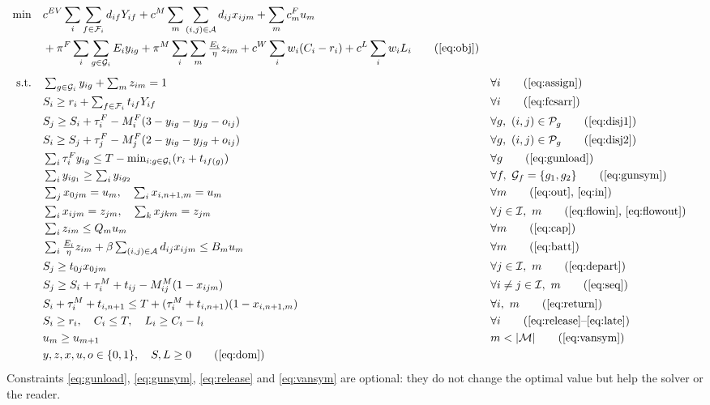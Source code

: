 \documentclass[11pt,a4paper]{article}
\newcommand{\I}{\mathcal{I}}
\newcommand{\F}{\mathcal{F}}
\newcommand{\G}{\mathcal{G}}
\newcommand{\M}{\mathcal{M}}
\newcommand{\A}{\mathcal{A}}
\begin{document}
{\small
\begin{align*}
\min\quad & c^{EV}\sum_{i}\sum_{f\in\F_i} d_{if}Y_{if}+c^{M}\sum_{m}\sum_{(i,j)\in\A} d_{ij}x_{ijm}+\sum_{m} c^{F}_mu_m \\
&+\pi^F\sum_{i}\sum_{g\in\G_i} E_iy_{ig}+\pi^M\sum_{i}\sum_{m}\tfrac{E_i}{\eta}z_{im}
+c^W\sum_{i} w_i(C_i - r_i)+c^L\sum_{i} w_iL_i \tag{\ref{eq:obj}}\\[4pt]
\text{s.t.}\quad
& \textstyle\sum_{g\in\G_i} y_{ig} + \sum_{m} z_{im} = 1 && \forall i \tag{\ref{eq:assign}}\\
& S_i \ge r_i + \textstyle\sum_{f\in\F_i} t_{if}Y_{if} && \forall i \tag{\ref{eq:fcsarr}}\\
& S_j \ge S_i + \tau^F_i - M^F_i(3 - y_{ig} - y_{jg} - o_{ij}) && \forall g,\ (i,j)\in\mathcal{P}_g \tag{\ref{eq:disj1}}\\
& S_i \ge S_j + \tau^F_j - M^F_j(2 - y_{ig} - y_{jg} + o_{ij}) && \forall g,\ (i,j)\in\mathcal{P}_g \tag{\ref{eq:disj2}}\\
& \textstyle\sum_{i}\tau^F_iy_{ig} \le T - \min_{i:g\in\G_i}(r_i+t_{if(g)}) && \forall g \tag{\ref{eq:gunload}}\\
& \textstyle\sum_{i} y_{ig_1} \ge \sum_{i} y_{ig_2} && \forall f,\ \G_f=\{g_1,g_2\} \tag{\ref{eq:gunsym}}\\
& \textstyle\sum_{j} x_{0jm} = u_m,\quad \sum_{i} x_{i,n+1,m} = u_m && \forall m \tag{\ref{eq:out}, \ref{eq:in}}\\
& \textstyle\sum_{i} x_{ijm} = z_{jm},\quad \sum_{k} x_{jkm} = z_{jm} && \forall j\in\I,\ m \tag{\ref{eq:flowin}, \ref{eq:flowout}}\\
& \textstyle\sum_{i} z_{im} \le Q_mu_m && \forall m \tag{\ref{eq:cap}}\\
& \textstyle\sum_{i}\frac{E_i}{\eta}z_{im} + \beta\sum_{(i,j)\in\A} d_{ij}x_{ijm} \le B_mu_m && \forall m \tag{\ref{eq:batt}}\\
& S_j \ge t_{0j}x_{0jm} && \forall j\in\I,\ m \tag{\ref{eq:depart}}\\
& S_j \ge S_i + \tau^M_i + t_{ij} - M^M_{ij}(1-x_{ijm}) && \forall i\ne j\in\I,\ m \tag{\ref{eq:seq}}\\
& S_i + \tau^M_i + t_{i,n+1} \le T + (\tau^M_i + t_{i,n+1})(1-x_{i,n+1,m}) && \forall i,\ m \tag{\ref{eq:return}}\\
& S_i \ge r_i,\quad C_i \le T,\quad L_i \ge C_i - l_i && \forall i \tag{\ref{eq:release}--\ref{eq:late}}\\
& u_m \ge u_{m+1} && m<|\M| \tag{\ref{eq:vansym}}\\
& y,z,x,u,o\in\{0,1\},\quad S,L\ge 0 \tag{\ref{eq:dom}}
\end{align*}
}
Constraints \eqref{eq:gunload}, \eqref{eq:gunsym}, \eqref{eq:release} and \eqref{eq:vansym} are optional: they do not change the optimal value but help the solver or the reader.
\end{document}
